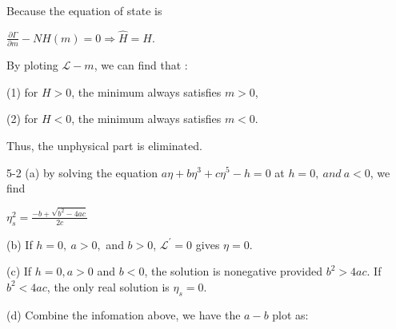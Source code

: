 \documentclass[12pt,titlepage]{article}
\numberwithin{equation}{section}
\begin{document}
Because the equation of state is

$\displaystyle \frac{\partial \Gamma }{\partial m} -NH( m) =0\Rightarrow \hat{H} =H$.

By ploting $\displaystyle \mathcal{L} -m$, we can find that :

(1) for $\displaystyle H >0$, the minimum always satisfies $\displaystyle m >0$,

(2) for $\displaystyle H< 0$, the minimum always satisfies $\displaystyle m< 0$.

Thus, the unphysical part is eliminated.

5-2 (a) by solving the equation $\displaystyle a\eta +b\eta ^{3} +c\eta ^{5} -h=0$ at $\displaystyle h=0,\ and\ a< 0$, we find

$\displaystyle \eta ^{2}_{s} =\frac{-b+\sqrt{b^{2} -4ac}}{2c}$

(b) If $\displaystyle h=0,\ a >0,$ and $\displaystyle b >0$, $\displaystyle \mathcal{L}^{'} =0$ gives $\displaystyle \eta =0$.

(c) If $\displaystyle h=0,a >0$ and $\displaystyle b< 0$, the solution is nonegative provided $\displaystyle b^{2}  >4ac.$ If $\displaystyle b^{2} < 4ac$, the only real solution is $\displaystyle \eta _{s} =0$.

(d) Combine the infomation above, we have the $\displaystyle a-b$ plot as:

\end{document}
